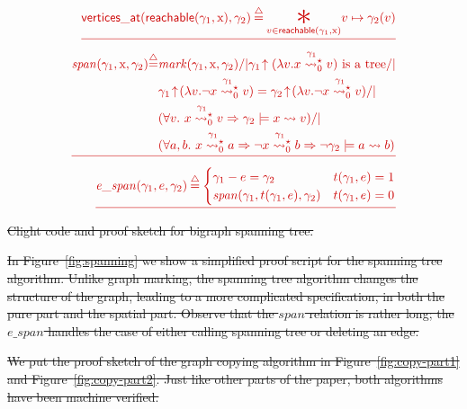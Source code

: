 \documentclass[acmsmall,screen]{acmart}  %
\newcommand{\defeq}{\mathbin{\stackrel{\triangle}{=}}} %
\newcommand{\tx}[1]{\text{#1}}
\newcommand{\p}[1]{\ensuremath{\mathsf{#1}}} \newcommand{\m}[1]{\ensuremath{\mathit{#1}}} \newcommand{\ma}[1]{\ensuremath{\mathcal{#1}}} \let\ramify\lightning
\providecommand{\DIFdel}[1]{{\protect\color{red}\sout{#1}}}                      %
\providecommand{\DIFdelFL}[1]{\DIFdel{#1}} %
\begin{document}
\begin{eqnarray*}
  \DIFdelFL{\p{vertices\_at}(\p{reachable}(\gamma_1, \tx x), \gamma_2)\defeq \underset{v\in\p{reachable}(\gamma_1, \tx x)}{\bigstar}v \mapsto \gamma_2(v)}\\
  \DIFdelFL{\begin{split}
  \m{span}(\gamma_1, \tx x, \gamma_2)\defeq &\m{mark}(\gamma_1,\tx x, \gamma_2) /| \gamma_1\!\uparrow(\lambda v. x\mathrel{{\stackrel{\gamma_1~}{\leadsto^{\star}_{0}}}} v) \text{ is a tree} /| \null\\
  & \gamma_1\!\uparrow\!(\lambda v.\neg x\mathrel{{\stackrel{\gamma_1~}{\leadsto^{\star}_{0}}}} v) = \gamma_2\!\uparrow\!(\lambda v.\neg x\mathrel{{\stackrel{\gamma_1~}{\leadsto^{\star}_{0}}}} v) /| \null\\
  & (\forall v.~x\mathrel{{\stackrel{\gamma_1~}{\leadsto^{\star}_{0}}}} v => \gamma_2\models x \leadsto v) /| \null\\
  & (\forall a,b.~x\mathrel{{\stackrel{\gamma_1~}{\leadsto^{\star}_{0}}}} a => \neg x\mathrel{{\stackrel{\gamma_1~}{\leadsto^{\star}_{0}}}} b => \neg \gamma_2\models a \leadsto b)\\
  \end{split}}\\
  \DIFdelFL{\m{e\_span}(\gamma_1, e, \gamma_2)\defeq
  \begin{cases}
    \gamma_1 - e = \gamma_2  & t(\gamma_1,e)=1\\
    \m{span}(\gamma_1, t(\gamma_1,e), \gamma_2) & t(\gamma_1,e)=0\\
  \end{cases}
}\end{eqnarray*}
{%
\DIFdelFL{Clight code and proof sketch for bigraph spanning tree.}}


\DIFdel{In Figure~\ref{fig:spanning} we show a simplified proof script for the spanning tree algorithm.  Unlike graph marking, the spanning tree algorithm changes the
structure of the graph, leading to a more complicated specification,
in both the pure part and the spatial part. Observe that the $\m{span}$ relation is
rather long; the $\m{e\_span}$ handles the case of either calling spanning tree or deleting an edge.
}%

\DIFdel{We put the proof sketch of the graph copying algorithm in
Figure~\ref{fig:copy-part1} and Figure~\ref{fig:copy-part2}. Just like
other parts of the paper,
both algorithms have been machine verified.
}%
\end{document}
